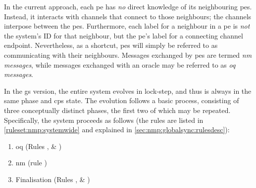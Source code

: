 In the current approach, each \gls{pe} has \emph{no} direct knowledge of its neighbouring \glspl{pe}.  Instead, it interacts with channels that connect to those neighbours; the channels interpose between the \glspl{pe}.  Furthermore, each label for a neighbour in a \gls{pe} is \emph{not} the system's ID for that neighbour, but the \gls{pe}'s label for a connecting channel endpoint.  Nevertheless, as a shortcut, \glspl{pe} will simply be referred to as communicating with their neighbours.  Messages exchanged by \glspl{pe} are termed \emph{\gls{nm} messages}, while messages exchanged with an oracle may be referred to as \emph{\gls{oq} messages}.

In the \gls{gs} version, the entire system evolves in lock-step, and thus is always in the same phase and \gls{cps} state.  The evolution follows a basic process, consisting of three conceptually distinct phases, the first two of which may be repeated.  Specifically, the system proceeds as follows (the rules are listed in \vref{ruleset:nmp:systemwide} and explained in \vref{sec:nmp:globalsync:rulesdesc}):

\begin{enumerate}
    \item\label{enumitem:nmp:pu} \Gls{oq} (Rules ,  \& )
    \item\label{enumitem:nmp:nm} \Gls{nm} (rule )
    \item\label{enumitem:nmp:final} Finalisation (Rules ,  \& )
\end{enumerate}


